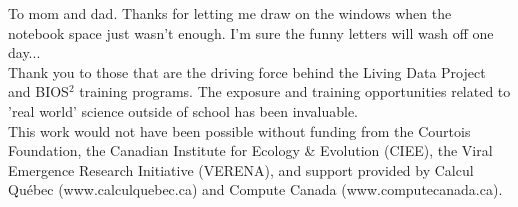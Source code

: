 \documentclass[12pt,oneside,phd]{dms}
\numberwithin{equation}{section}
\numberwithin{table}{chapter}
\numberwithin{figure}{chapter}
\begin{document}
To mom and dad. Thanks for letting me draw on the windows when the notebook space just wasn't enough. I'm sure the funny letters will wash off one day...\\

Thank you to those that are the driving force behind the Living Data Project and BIOS$^2$ training programs. The exposure and training opportunities related to 'real world' science outside of school has been invaluable.\\

This work would not have been possible without funding from the Courtois Foundation, the Canadian Institute for Ecology \& Evolution (CIEE), the Viral Emergence Research Initiative (VERENA), and support provided by Calcul Québec (www.calculquebec.ca) and Compute Canada (www.computecanada.ca).


\NoChapterPageNumber
\cleardoublepage













\appendix



\end{document}
